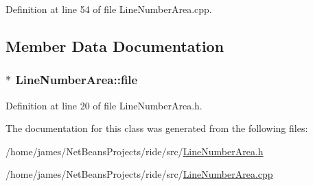 Definition at line 54 of file Line\-Number\-Area.\-cpp.



\subsection{Member Data Documentation}
\hypertarget{class_line_number_area_a08ebbed0dba5e4740c0af7d006614922}{
\subsubsection[{file}]{$\ast$ Line\-Number\-Area\-::file\hspace{0.3cm}{\ttfamily [private]}}}\label{class_line_number_area_a08ebbed0dba5e4740c0af7d006614922}


Definition at line 20 of file Line\-Number\-Area.\-h.



The documentation for this class was generated from the following files\-:\begin{DoxyCompactItemize}
\item 
/home/james/\-Net\-Beans\-Projects/ride/src/\hyperlink{_line_number_area_8h}{Line\-Number\-Area.\-h}\item 
/home/james/\-Net\-Beans\-Projects/ride/src/\hyperlink{_line_number_area_8cpp}{Line\-Number\-Area.\-cpp}\end{DoxyCompactItemize}
